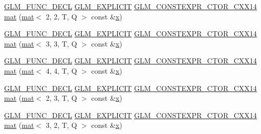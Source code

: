 \begin{DoxyCompactItemize}
\item 
\hyperlink{setup_8hpp_ab2d052de21a70539923e9bcbf6e83a51}{G\+L\+M\+\_\+\+F\+U\+N\+C\+\_\+\+D\+E\+CL} \hyperlink{setup_8hpp_a6c74f5a5e7b134ab69023ff9a30d4d5d}{G\+L\+M\+\_\+\+E\+X\+P\+L\+I\+C\+IT} \hyperlink{setup_8hpp_a0900f9145e68bf6061b6f5e7be3fa751}{G\+L\+M\+\_\+\+C\+O\+N\+S\+T\+E\+X\+P\+R\+\_\+\+C\+T\+O\+R\+\_\+\+C\+X\+X14} \hyperlink{structglm_1_1mat_3_013_00_014_00_01_t_00_01_q_01_4_a9ea407c011cc5e69bfc2f7deda69dcc7}{mat} (\hyperlink{structglm_1_1mat}{mat}$<$ 2, 2, T, Q $>$ const \&\hyperlink{_s_d_l__opengl_8h_ad0e63d0edcdbd3d79554076bf309fd47}{x})
\item 
\hyperlink{setup_8hpp_ab2d052de21a70539923e9bcbf6e83a51}{G\+L\+M\+\_\+\+F\+U\+N\+C\+\_\+\+D\+E\+CL} \hyperlink{setup_8hpp_a6c74f5a5e7b134ab69023ff9a30d4d5d}{G\+L\+M\+\_\+\+E\+X\+P\+L\+I\+C\+IT} \hyperlink{setup_8hpp_a0900f9145e68bf6061b6f5e7be3fa751}{G\+L\+M\+\_\+\+C\+O\+N\+S\+T\+E\+X\+P\+R\+\_\+\+C\+T\+O\+R\+\_\+\+C\+X\+X14} \hyperlink{structglm_1_1mat_3_013_00_014_00_01_t_00_01_q_01_4_a4bfbb5e6d5cebec79ecdc6c2b62507e4}{mat} (\hyperlink{structglm_1_1mat}{mat}$<$ 3, 3, T, Q $>$ const \&\hyperlink{_s_d_l__opengl_8h_ad0e63d0edcdbd3d79554076bf309fd47}{x})
\item 
\hyperlink{setup_8hpp_ab2d052de21a70539923e9bcbf6e83a51}{G\+L\+M\+\_\+\+F\+U\+N\+C\+\_\+\+D\+E\+CL} \hyperlink{setup_8hpp_a6c74f5a5e7b134ab69023ff9a30d4d5d}{G\+L\+M\+\_\+\+E\+X\+P\+L\+I\+C\+IT} \hyperlink{setup_8hpp_a0900f9145e68bf6061b6f5e7be3fa751}{G\+L\+M\+\_\+\+C\+O\+N\+S\+T\+E\+X\+P\+R\+\_\+\+C\+T\+O\+R\+\_\+\+C\+X\+X14} \hyperlink{structglm_1_1mat_3_013_00_014_00_01_t_00_01_q_01_4_a54d782d9277827950d25eb9cf200cdd4}{mat} (\hyperlink{structglm_1_1mat}{mat}$<$ 4, 4, T, Q $>$ const \&\hyperlink{_s_d_l__opengl_8h_ad0e63d0edcdbd3d79554076bf309fd47}{x})
\item 
\hyperlink{setup_8hpp_ab2d052de21a70539923e9bcbf6e83a51}{G\+L\+M\+\_\+\+F\+U\+N\+C\+\_\+\+D\+E\+CL} \hyperlink{setup_8hpp_a6c74f5a5e7b134ab69023ff9a30d4d5d}{G\+L\+M\+\_\+\+E\+X\+P\+L\+I\+C\+IT} \hyperlink{setup_8hpp_a0900f9145e68bf6061b6f5e7be3fa751}{G\+L\+M\+\_\+\+C\+O\+N\+S\+T\+E\+X\+P\+R\+\_\+\+C\+T\+O\+R\+\_\+\+C\+X\+X14} \hyperlink{structglm_1_1mat_3_013_00_014_00_01_t_00_01_q_01_4_ac62ec0deac611d71709c0489a9a8880b}{mat} (\hyperlink{structglm_1_1mat}{mat}$<$ 2, 3, T, Q $>$ const \&\hyperlink{_s_d_l__opengl_8h_ad0e63d0edcdbd3d79554076bf309fd47}{x})
\item 
\hyperlink{setup_8hpp_ab2d052de21a70539923e9bcbf6e83a51}{G\+L\+M\+\_\+\+F\+U\+N\+C\+\_\+\+D\+E\+CL} \hyperlink{setup_8hpp_a6c74f5a5e7b134ab69023ff9a30d4d5d}{G\+L\+M\+\_\+\+E\+X\+P\+L\+I\+C\+IT} \hyperlink{setup_8hpp_a0900f9145e68bf6061b6f5e7be3fa751}{G\+L\+M\+\_\+\+C\+O\+N\+S\+T\+E\+X\+P\+R\+\_\+\+C\+T\+O\+R\+\_\+\+C\+X\+X14} \hyperlink{structglm_1_1mat_3_013_00_014_00_01_t_00_01_q_01_4_a0a37b8a88adf100dd0f00d448074e8a0}{mat} (\hyperlink{structglm_1_1mat}{mat}$<$ 3, 2, T, Q $>$ const \&\hyperlink{_s_d_l__opengl_8h_ad0e63d0edcdbd3d79554076bf309fd47}{x})

\end{DoxyCompactItemize}
